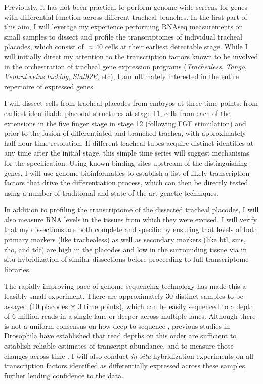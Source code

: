 \documentclass{proposal}
\begin{document}
Previously, it has not been practical to perform genome-wide screens for genes with differential function across different tracheal branches.
In the first part of this aim, I will leverage my experience performing RNAseq measurements on small samples to dissect and profile the transcriptomes of individual tracheal placodes, which consist of $\approx$40 cells at their earliest detectable stage.
While I will initially direct my attention to the transcription factors known to be involved in the orchestration of tracheal gene expression programs ({\em Trachealess}, {\em Tango}, {\em Ventral veins lacking}, {\em Stat92E}, etc), I am ultimately interested in the entire repertoire of expressed genes.

I will dissect cells from tracheal placodes from embryos at three time points: from earliest identifiable placodal structures at stage 11, cells from each of the extensions in the five finger stage in stage 12 (following FGF stimulation) and prior to the fusion of differentiated and branched trachea, with approximately half-hour time resolution.
If different tracheal tubes acquire distinct identities at any time after the initial stage, this simple time series will suggest mechanisms for the specification.
Using known binding sites upstream of the distinguishing genes, I will use genome bioinformatics to establish a list of likely transcription factors that drive the differentiation process, which can then be directly tested using a number of traditional and state-of-the-art genetic techniques.

In addition to profiling the transcriptome of the dissected tracheal placodes, I will also measure RNA levels in the tissues from which they were excised.
I will verify that my dissections are both complete and specific by ensuring that levels of both primary markers (like trachealess) as well as secondary markers (like btl, sms, rho, and tdf) are high in the placodes and low in the surrounding tissue via in situ hybridization of similar dissections before proceeding to full transcriptome libraries.

The rapidly improving pace of genome sequencing technology has made this a feasibly small experiment.  
There are approximately 30 distinct samples to be assayed (10 placodes $\times$ 3 time points), which can be easily sequenced to a depth of 6 million reads in a single lane or deeper across multiple lanes.
Although there is not a uniform consensus on how deep to sequence \cite{Sims:2014ci}, previous studies in Drosophila have established that read depths on this order are sufficient to establish reliable estimates of transcript abundance, and to measure those changes across time \cite{Lott:2011cc, Combs:2013jy}.
I will also conduct {\em in situ} hybridization experiments on all transcription factors identified as differentially expressed across these samples, further lending confidence to the data.
\end{document}
